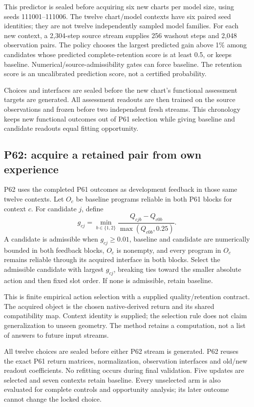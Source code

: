 \documentclass[11pt]{article}
\begin{document}
This predictor is sealed before acquiring six new charts per model size, using seeds 111001--111006. The twelve chart/model contexts have six paired seed identities; they are not twelve independently sampled model families. For each new context, a 2,304-step source stream supplies 256 washout steps and 2,048 observation pairs. The policy chooses the largest predicted gain above 1\% among candidates whose predicted complete-retention score is at least 0.5, or keeps baseline. Numerical/source-admissibility gates can force baseline. The retention score is an uncalibrated prediction score, not a certified probability.

Choices and interfaces are sealed before the new chart's functional assessment targets are generated. All assessment readouts are then trained on the source observations and frozen before two independent fresh streams. This chronology keeps new functional outcomes out of P61 selection while giving baseline and candidate readouts equal fitting opportunity.

\subsection{P62: acquire a retained pair from own experience}
P62 uses the completed P61 outcomes as development feedback in those same twelve contexts. Let $O_c$ be baseline programs reliable in both P61 blocks for context $c$. For candidate $j$, define
\begin{equation}
 g_{cj}=\min_{b\in\{1,2\}}\frac{Q_{cjb}-Q_{c0b}}{\max(Q_{c0b},0.25)}.
\end{equation}
A candidate is admissible when $g_{cj}\geq0.01$, baseline and candidate are numerically bounded in both feedback blocks, $O_c$ is nonempty, and every program in $O_c$ remains reliable through its acquired interface in both blocks. Select the admissible candidate with largest $g_{cj}$, breaking ties toward the smaller absolute action and then fixed slot order. If none is admissible, retain baseline.

This is finite empirical action selection with a supplied quality/retention contract. The acquired object is the chosen native-derived return and its shared compatibility map. Context identity is supplied; the selection rule does not claim generalization to unseen geometry. The method retains a computation, not a list of answers to future input streams.

All twelve choices are sealed before either P62 stream is generated. P62 reuses the exact P61 return matrices, normalization, observation interfaces and old/new readout coefficients. No refitting occurs during final validation. Five updates are selected and seven contexts retain baseline. Every unselected arm is also evaluated for complete controls and opportunity analysis; its later outcome cannot change the locked choice.
\end{document}
